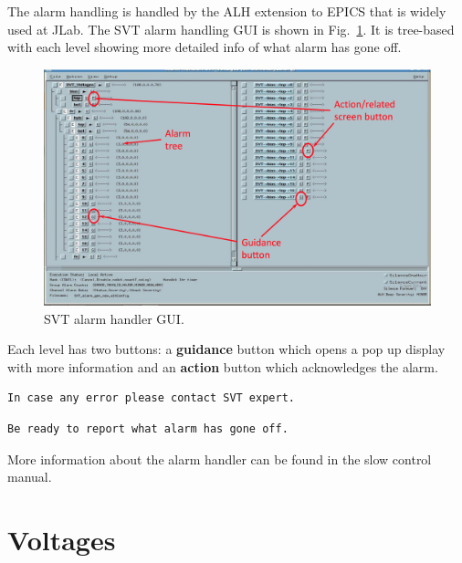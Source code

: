 \documentclass[12pt]{report}
\begin{document}
The alarm handling is handled by the ALH extension to EPICS that is widely used at JLab. The SVT alarm handling GUI is shown in Fig.~\ref{fig:svt_alarm_gui}. It is tree-based with each level showing more detailed info of what alarm has gone off. 
\begin{figure}
\includegraphics[width=12cm]{svt_alarm_gui}
\caption{SVT alarm handler GUI.\label{fig:svt_alarm_gui}}
\end{figure}

Each level has two buttons: a \textbf{guidance} button which opens a pop up display with more information and an \textbf{action} button which acknowledges the alarm. 

\begin{verbatim}
In case any error please contact SVT expert.
\end{verbatim}
\begin{verbatim}
Be ready to report what alarm has gone off.
\end{verbatim}

More information about the alarm handler can be found in the slow control manual. 


\section{Voltages}
\label{sec:proc_voltages}
\end{document}
